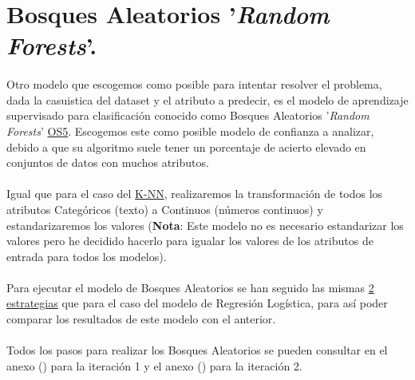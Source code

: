 \section{Bosques Aleatorios '\textit{Random Forests}'.}
\label{section:rf}

\paragraph{}
Otro modelo que escogemos como posible para intentar resolver el problema, dada la casuistica del dataset y el atributo a predecir, es el modelo de aprendizaje supervisado para clasificación conocido como Bosques Aleatorios '\textit{Random Forests}'\cite{ref:rf_def} \hyperref[os:OS5]{OS5}. Escogemos este como posible modelo de confianza a analizar, debido a que su algoritmo suele tener un porcentaje de acierto elevado en conjuntos de datos con muchos atributos.

\paragraph{}
Igual que para el caso del \hyperref[section:knn]{K-NN}, realizaremos la transformación de todos los atributos Categóricos (texto) a Continuos (números continuos) y estandarizaremos los valores (\textbf{Nota}: Este modelo no es necesario estandarizar los valores pero he decidido hacerlo para igualar los valores de los atributos de entrada para todos los modelos).

\paragraph{}
Para ejecutar el modelo de Bosques Aleatorios se han seguido las mismas \hyperref[section:lr_casos]{2 estrategias} que para el caso del modelo de Regresión Logística, para así poder comparar los resultados de este modelo con el anterior.

\paragraph{}
Todos los pasos para realizar los Bosques Aleatorios se pueden consultar en el anexo () para la iteración 1 y el anexo () para la iteración 2.
